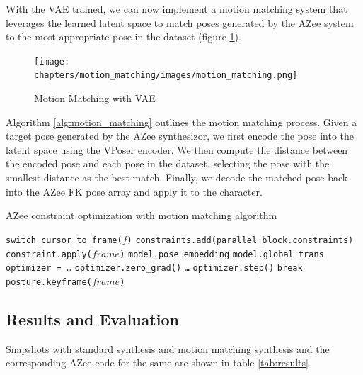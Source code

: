 \documentclass[../../main.tex]{subfiles}
\begin{document}
With the VAE trained, we can now implement a motion matching system that leverages the learned latent space to match poses generated by the AZee system to the most appropriate pose in the dataset (figure \ref{fig:motion_matching}).

\begin{figure}
  \centering \texttt{[image: chapters/motion\_matching/images/motion\_matching.png]}
  \caption{Motion Matching with VAE}
  \label{fig:motion_matching}
\end{figure}

Algorithm \ref{alg:motion_matching} outlines the motion matching process. Given a target pose generated by the AZee synthesizor, we first encode the pose into the latent space using the VPoser encoder. We then compute the distance between the encoded pose and each pose in the dataset, selecting the pose with the smallest distance as the best match. Finally, we decode the matched pose back into the AZee FK pose array and apply it to the character.

\begin{algorithm}
  \caption{AZee constraint optimization with motion matching algorithm}
  \label{alg:motion_matching}
  \begin{algorithmic}[1]
      \State \texttt{switch\_cursor\_to\_frame($f$)}
          \State \texttt{constraints.add(parallel\_block.constraints)}
      \EndFor
          \State \texttt{constraint.apply($frame$)}
      \EndFor
      \State \texttt{model.pose\_embedding}
      \State \texttt{model.global\_trans}
      \State \texttt{optimizer = \dots}
          \State \texttt{optimizer.zero\_grad()}
          \State \texttt{\dots}
          \State \texttt{optimizer.step()}
           \State \texttt{break} \EndIf
      \EndFor
      \State \texttt{posture.keyframe($frame$)}
  \EndFor
  \end{algorithmic}
  \end{algorithm}

\subsection{Results and Evaluation}
\label{ch:motion_matching:motion_matching_with_azee:results}

Snapshots with standard synthesis and motion matching synthesis and the corresponding AZee code for the same are shown in table \ref{tab:results}.
\end{document}
